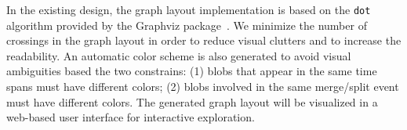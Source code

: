 In the existing design, the graph layout implementation is based on the \texttt{dot} algorithm provided by the Graphviz package~\cite{GansnerN00}.  We minimize the number of crossings in the graph layout in order to reduce visual clutters and to increase the readability.  An automatic color scheme is also generated to avoid visual ambiguities based the two constrains: (1) blobs that appear in the same time spans must have different colors; (2) blobs involved in the same merge/split event must have different colors.  The generated graph layout will be visualized in a web-based user interface for interactive exploration. 


% 


% 


